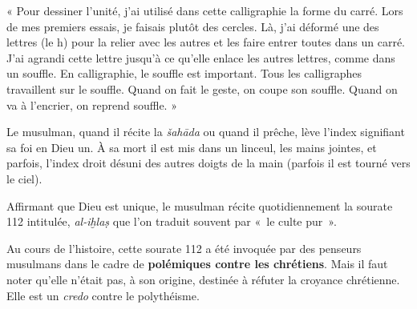 « Pour dessiner l'unité, j'ai utilisé dans cette calligraphie la forme
du carré. Lors de mes premiers essais, je faisais plutôt des cercles.
Là, j'ai déformé une des lettres (le h) pour la relier avec les autres
et les faire entrer toutes dans un carré. J'ai agrandi cette lettre
jusqu'à ce qu'elle enlace les autres lettres, comme dans un souffle. En
calligraphie, le souffle est important. Tous les calligraphes
travaillent sur le souffle. Quand on fait le geste, on coupe son
souffle. Quand on va à l'encrier, on reprend souffle. » 



Le musulman, quand il récite la \emph{šahāda} ou quand il prêche, lève
l'index signifiant sa foi en Dieu un. À sa mort il est mis dans un
linceul, les mains jointes, et parfois, l'index droit désuni des autres
doigts de la main (parfois il est tourné vers le ciel).




Affirmant que Dieu est unique, le musulman récite quotidiennement la
sourate 112 intitulée, \emph{al-iḫlaṣ} que l'on traduit souvent par «~le
culte pur~».


\begin{table}
\caption{sourate 112 , \emph{al-iḫlaṣ}, «~le
culte pur~»}
\end{table}



Au cours de l'histoire, cette sourate 112 a été invoquée par des
penseurs musulmans dans le cadre de \textbf{polémiques contre les
chrétiens}. Mais il faut noter qu'elle n'était pas, à son origine,
destinée à réfuter la croyance chrétienne. Elle est un \emph{credo}
contre le polythéisme.

